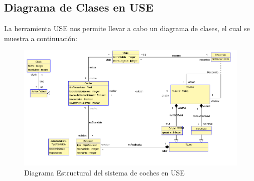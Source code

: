 \documentclass[12pt.a4paper]{article}
\begin{document}
\subsection{Diagrama de Clases en USE}
La herramienta USE nos permite llevar a cabo un diagrama de clases, el cual se muestra a continuación:
\begin{figure}[H]
     \includegraphics[width=1\linewidth]{diagramas/USE_A.png}
     \caption{Diagrama Estructural del sistema de coches en USE}
     \label{Diagrama Estrucutural del sistema de coches en USE}
\end{figure}
\vspace{1.0cm}
\end{document}
